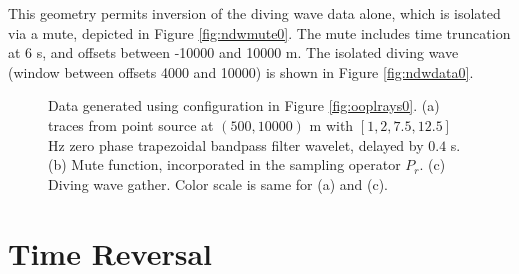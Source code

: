 \documentclass[georeport,12pt]{geophysics}
\begin{document}
This geometry permits inversion of the diving wave data alone, which
is isolated via a mute, depicted in Figure \ref{fig:ndwmute0}. The
mute includes time truncation at 6 s, and offsets between -10000 and
10000 m. The isolated
diving wave (window between offsets 4000 and 10000) is shown in
Figure \ref{fig:ndwdata0}. 


\begin{figure}
  \centering
  \caption{Data generated using configuration in Figure
    \ref{fig:ooplrays0}. (a) traces from point source at $(500,10000)$ m
    with $[1, 2, 7.5, 12.5]$ Hz zero phase trapezoidal bandpass
    filter wavelet, delayed by $0.4$ s. (b) Mute function,
    incorporated in the sampling operator $P_r$. (c) Diving wave
    gather. Color scale is same for (a) and (c).}
\end{figure}

\section{Time Reversal}
\end{document}
